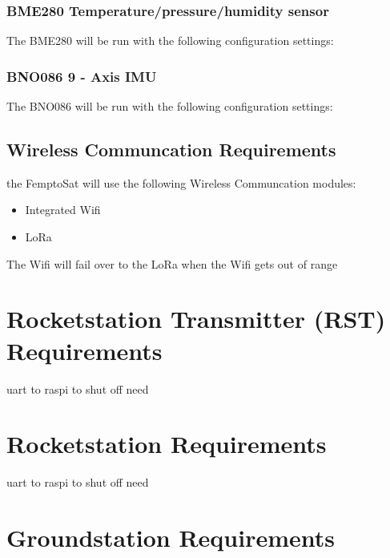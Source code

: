 \documentclass{book}
\begin{document}
\subsubsection{BME280 Temperature/pressure/humidity sensor}
\par The BME280 will be run with the following configuration settings: 

\subsubsection{BNO086 9 - Axis IMU}
\par The BNO086 will be run with the following configuration settings:

\subsection{Wireless Communcation Requirements}
\par the FemptoSat will use the following Wireless Communcation modules:
\begin{itemize}
    \item Integrated Wifi
    \item LoRa
\end{itemize}
\par The Wifi will fail over to the LoRa when the Wifi gets out of range

\section{Rocketstation Transmitter (RST) Requirements}
\par uart to raspi to shut off need

\section{Rocketstation Requirements}
\par uart to raspi to shut off need
\section{Groundstation Requirements}





%

%
%
\end{document}
